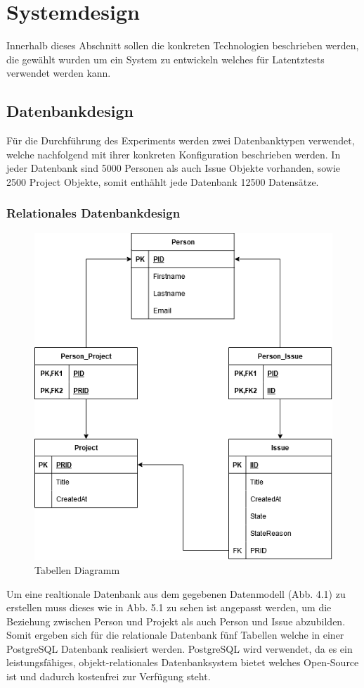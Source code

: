 \chapter{Systemdesign} %
\label{sec:systemdesign}
Innerhalb dieses Abschnitt sollen die konkreten Technologien beschrieben werden, die gewählt wurden um ein System zu entwickeln welches für Latentztests verwendet werden kann.
\section{Datenbankdesign} %
Für die Durchführung des Experiments werden zwei Datenbanktypen verwendet, welche nachfolgend mit ihrer konkreten Konfiguration beschrieben werden. In jeder Datenbank sind 5000 Personen als auch Issue Objekte vorhanden, sowie 2500 Project Objekte, somit enthählt jede Datenbank 12500 Datensätze.
\label{sec:datenbankdesign}
\subsection{Relationales Datenbankdesign} %
\label{sec:relationalesdatenbankdesign}

\begin{figure}[H]
	\centering
	\includegraphics[scale=0.6]{Illustrations/table_diagram.png}
	\caption{Tabellen Diagramm}
\end{figure}
Um eine realtionale Datenbank aus dem gegebenen Datenmodell (Abb. 4.1) zu erstellen muss dieses wie in Abb. 5.1 zu sehen ist angepasst werden, um die Beziehung zwischen Person und Projekt als auch Person und Issue abzubilden. Somit ergeben sich für die relationale Datenbank fünf Tabellen welche in einer PostgreSQL Datenbank realisiert werden. PostgreSQL wird verwendet, da es ein leistungsfähiges, objekt-relationales Datenbanksystem bietet welches Open-Source ist und dadurch kostenfrei zur Verfügung steht. 

